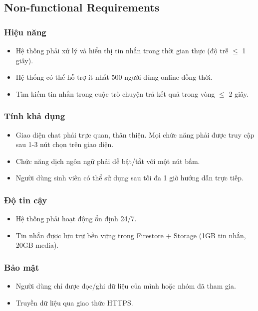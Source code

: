 \documentclass[a4paper, 12pt]{article}
\begin{document}
	\subsection{Non-functional Requirements}
	\subsubsection{Hiệu năng}
	\begin{itemize}
		\item Hệ thống phải xử lý và hiển thị tin nhắn trong thời gian thực (độ trễ $\leq$ 1 giây).
		\item Hệ thống có thể hỗ trợ ít nhất 500 người dùng online đồng thời.
		\item Tìm kiếm tin nhắn trong cuộc trò chuyện trả kết quả trong vòng $\leq$ 2 giây.
	\end{itemize}
	
	\subsubsection{Tính khả dụng}
	\begin{itemize}
		\item Giao diện chat phải trực quan, thân thiện. Mọi chức năng phải được truy cập sau 1-3 nút chọn trên giao diện.
		\item Chức năng dịch ngôn ngữ phải dễ bật/tắt với một nút bấm.
		\item Người dùng sinh viên có thể sử dụng sau tối đa 1 giờ hướng dẫn trực tiếp.
	\end{itemize}
	
	\subsubsection{Độ tin cậy}
	\begin{itemize}
		\item Hệ thống phải hoạt động ổn định 24/7.
		\item Tin nhắn được lưu trữ bền vững trong Firestore + Storage (1GB tin nhắn, 20GB media).
	\end{itemize}
	
	\subsubsection{Bảo mật}
	\begin{itemize}
		\item Người dùng chỉ được đọc/ghi dữ liệu của mình hoặc nhóm đã tham gia.
		\item Truyền dữ liệu qua giao thức HTTPS.
	\end{itemize}
	
\end{document}
